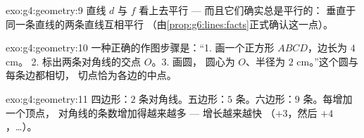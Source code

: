 \begin{solution}{exo:g4:geometry:9}
直线 $d$ 与 $f$ 看上去平行 --- 而且它们确实总是平行的：
垂直于同一条直线的两条直线互相平行
（由\cref{prop:g6:lines:facts}正式确认这一点）。
\end{solution}

\begin{solution}{exo:g4:geometry:10}
一种正确的作图步骤是：“1. 画一个正方形 $ABCD$，边长为 $4$ cm。
2. 标出两条对角线的交点 $O$。3. 画圆，
圆心为 $O$、半径为 $2$ cm。”这个圆与每条边都相切，
切点恰为各边的中点。
\end{solution}

\begin{solution}{exo:g4:geometry:11}
四边形：$2$ 条对角线。五边形：$5$ 条。六边形：$9$ 条。每增加一个顶点，
对角线的条数增加得越来越多 --- 增长越来越快
（$+3$，然后 $+4$，\dots）。
\end{solution}

